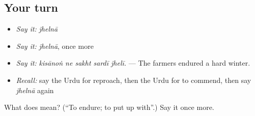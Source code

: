 \subsection*{Your turn}
\begin{itemize}
\raggedright
  \item \emph{Say it:} \emph{jhelnā}
  \item \emph{Say it:} \emph{jhelnā}, once more
  \item \emph{Say it:} \emph{kisānoṅ ne sakht sardī jhelī.} — The farmers endured a hard winter.
  \item \emph{Recall:} say the Urdu for reproach, then the Urdu for to commend, then say \emph{jhelnā} again
\end{itemize}

\begin{tcolorbox}[breakable,colback=teal!4,colframe=teal!35!black,title={Before you move on}]
What does  mean? (\textquotedblleft{}To endure; to put up with\textquotedblright{}.) Say it once more.
\end{tcolorbox}
